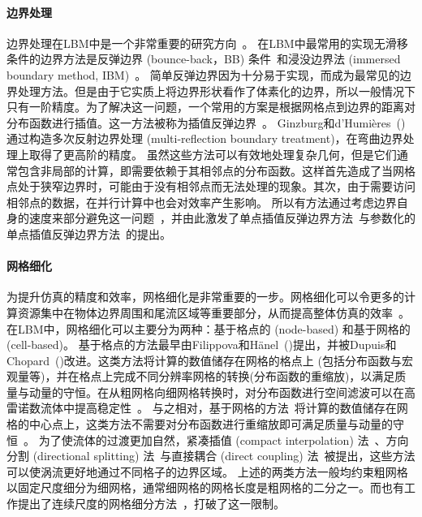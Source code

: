 \paragraph{边界处理}
边界处理在LBM中是一个非常重要的研究方向~\cite{Marson-2022}。
在LBM中最常用的实现无滑移条件的边界方法是反弹边界 (bounce-back，BB) 条件~\cite{Ladd-1994, Bouzidi-2001, Ginzburg-2003, Chun-2007}和浸没边界法 (immersed boundary method, IBM)~\cite{Peskin-1972, Lu-2012, Kang-2011, Patel-2018, Seo-2011, Chen-2013}。
简单反弹边界因为十分易于实现，而成为最常见的边界处理方法。但是由于它实质上将边界形状看作了体素化的边界，所以一般情况下只有一阶精度。为了解决这一问题，一个常用的方案是根据网格点到边界的距离对分布函数进行插值。这一方法被称为插值反弹边界~\cite{Bouzidi-2001, Yu-2003}。
Ginzburg和d'Humières~(\citeyear{Ginzburg-2003}) 通过构造多次反射边界处理 (multi-reflection boundary treatment)，在弯曲边界处理上取得了更高阶的精度。
虽然这些方法可以有效地处理复杂几何，但是它们通常包含非局部的计算，即需要依赖于其相邻点的分布函数。这样首先造成了当网格点处于狭窄边界时，可能由于没有相邻点而无法处理的现象。其次，由于需要访问相邻点的数据，在并行计算中也会对效率产生影响。
所以有方法通过考虑边界自身的速度来部分避免这一问题~\cite{Chun-2007}，并由此激发了单点插值反弹边界方法~\cite{Zhao-2017, Geier-2015, Tao-2018-b}与参数化的单点插值反弹边界方法~\cite{Zhao-2019, Chen-2021-b, Marson-2021}的提出。

\paragraph{网格细化}
为提升仿真的精度和效率，网格细化是非常重要的一步。网格细化可以令更多的计算资源集中在物体边界周围和尾流区域等重要部分，从而提高整体仿真的效率~\cite{Sandoval-2012}。在LBM中，网格细化可以主要分为两种：基于格点的 (node-based) 和基于网格的 (cell-based)。
基于格点的方法最早由Filippova和Hänel~(\citeyear{Filippova-1998})提出，并被Dupuis和Chopard~(\citeyear{Dupuis-2003})改进。这类方法将计算的数值储存在网格的格点上 (包括分布函数与宏观量等)，并在格点上完成不同分辨率网格的转换(分布函数的重缩放)，以满足质量与动量的守恒。在从粗网格向细网格转换时，对分布函数进行空间滤波可以在高雷诺数流体中提高稳定性~\cite{Lagrava-2012}。
与之相对，基于网格的方法~\cite{Rohde-2006, Chen-2006}将计算的数值储存在网格的中心点上，这类方法不需要对分布函数进行重缩放即可满足质量与动量的守恒~\cite{Schornbaum-2016, Hasert-2014, Latt-2021}。
为了使流体的过渡更加自然，紧凑插值 (compact interpolation) 法~\cite{Fard-2015}、方向分割 (directional splitting) 法~\cite{Gendre-2017}与直接耦合 (direct coupling) 法~\cite{Astoul-2021}被提出，这些方法可以使涡流更好地通过不同格子的边界区域。
上述的两类方法一般均约束粗网格以固定尺度细分为细网格，通常细网格的网格长度是粗网格的二分之一。而也有工作提出了连续尺度的网格细分方法~\cite{Li-2019}，打破了这一限制。

